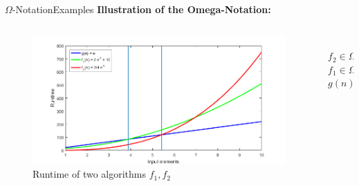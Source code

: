 
\begin{frame}{$\Omega$-Notation}{Examples}
  \textbf{Illustration of the Omega-Notation:}\\[-1.0em]
  \begin{columns}
    \begin{column}{0.9\textwidth}
      \begin{figure}[!h]
        \includegraphics[width=\linewidth]{Images/OmegaNotationRuntime.png}
        \caption{Runtime of two algorithms $f_1, f_2$}
        \label{fig:omega_o_runtime_example}
      \end{figure}
    \end{column}
    \begin{column}{0.1\textwidth}
      \vspace{-4.75em}\\
      \hspace*{-2.5em}$f_2 \in \Omega(g)$\\[2.0em]
      \hspace*{-2.5em}$f_1 \in \Omega(g)$\\[2.5em]
      \hspace*{-2.5em}$g(n)$
    \end{column}
  \end{columns}
\end{frame}


